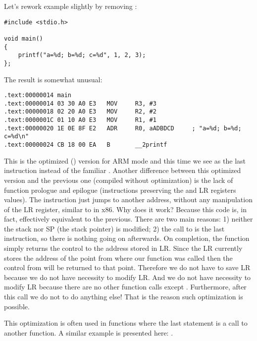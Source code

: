 \label{ARM_B_to_printf}

Let's rework example slightly by removing :

\begin{lstlisting}
#include <stdio.h>

void main()
{
	printf("a=%d; b=%d; c=%d", 1, 2, 3);
};
\end{lstlisting}

The result is somewhat unusual:

\begin{lstlisting}[caption=\OptimizingKeilVI (\ARMMode)]
.text:00000014 main
.text:00000014 03 30 A0 E3   MOV     R3, #3
.text:00000018 02 20 A0 E3   MOV     R2, #2
.text:0000001C 01 10 A0 E3   MOV     R1, #1
.text:00000020 1E 0E 8F E2   ADR     R0, aADBDCD     ; "a=%d; b=%d; c=%d\n"
.text:00000024 CB 18 00 EA   B       __2printf
\end{lstlisting}

This is the optimized (\Othree) version for ARM mode and this time we see  as the last instruction instead of the familiar .
Another difference between this optimized version and the previous one (compiled without optimization)
is the lack of function prologue and epilogue (instructions preserving the  and \ac{LR} registers values).
The  instruction just jumps to another address, without any manipulation of the \ac{LR} register,
similar to \JMP in x86.
Why does it work? Because this code is, in fact, effectively equivalent to the previous.
There are two main reasons: 1) neither the stack nor \ac{SP} (the \gls{stack pointer}) is modified;
2) the call to \printf is the last instruction, so there is nothing going on afterwards.
On completion, the \printf function simply returns the control to the address 
stored in \ac{LR}.
Since the \ac{LR} currently stores the address of the point from where our function
was called then the control from \printf will be returned to that point.
Therefore we do not have to save \ac{LR} because we do not have necessity to modify \ac{LR}.
And we do not have necessity to modify \ac{LR} because there are no other function calls except \printf. Furthermore,
after this call we do not to do anything else!
That is the reason such optimization is possible.

This optimization is often used in functions where the last statement is a call to another function.
A similar example is presented here:
.

